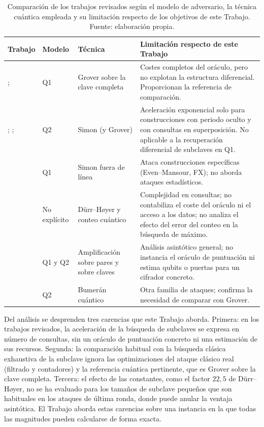 \begin{table}[H]
\centering
\small
\begin{tabular}{p{} p{} p{} p{}}
\hline\hline
Trabajo & Modelo & Técnica & Limitación respecto de este Trabajo \\
\hline
\citet{grassl2016}; \citet{jaques2020} & Q1 & Grover sobre la clave completa & Costes completos del oráculo, pero no explotan la estructura diferencial. Proporcionan la referencia de comparación. \\
\citet{kuwakado2010,kuwakado2012}; \citet{kaplan2016simon}; \citet{leander2017} & Q2 & Simon (y Grover) & Aceleración exponencial solo para construcciones con periodo oculto y con consultas en superposición. No aplicable a la recuperación diferencial de subclaves en Q1. \\
\citet{bonnetain2019} & Q1 & Simon fuera de línea & Ataca construcciones específicas (Even--Mansour, FX); no aborda ataques estadísticos. \\
\citet{zhou2019} & No explícito & Dürr--Høyer y conteo cuántico & Complejidad en consultas; no contabiliza el coste del oráculo ni el acceso a los datos; no analiza el efecto del error del conteo en la búsqueda de máximo. \\
\citet{kaplan2016diff} & Q1 y Q2 & Amplificación sobre pares y sobre claves & Análisis asintótico general; no instancia el oráculo de puntuación ni estima qubits o puertas para un cifrador concreto. \\
\citet{frixons2022} & Q2 & Bumerán cuántico & Otra familia de ataques; confirma la necesidad de comparar con Grover. \\
\hline
\end{tabular}
\caption[Trabajos sobre criptoanálisis cuántico de cifradores simétricos]{Comparación de los trabajos revisados según el modelo de adversario, la técnica cuántica empleada y su limitación respecto de los objetivos de este Trabajo. Fuente: elaboración propia.}
\label{tab:estado}
\end{table}

Del análisis se desprenden tres carencias que este Trabajo aborda. Primera: en los trabajos revisados, la aceleración de la búsqueda de subclaves se expresa en número de consultas, sin un oráculo de puntuación concreto ni una estimación de sus recursos. Segunda: la comparación habitual con la búsqueda clásica exhaustiva de la subclave ignora las optimizaciones del ataque clásico real (filtrado y contadores) y la referencia cuántica pertinente, que es Grover sobre la clave completa. Tercera: el efecto de las constantes, como el factor \(22{,}5\) de Dürr--Høyer, no se ha evaluado para los tamaños de subclave pequeños que son habituales en los ataques de última ronda, donde puede anular la ventaja asintótica. El Trabajo aborda estas carencias sobre una instancia en la que todas las magnitudes pueden calcularse de forma exacta.
